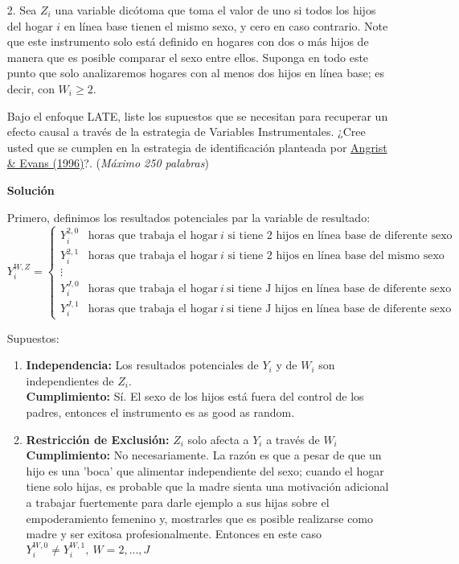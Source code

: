 \documentclass[a4paper, answers, addpoints, 11pt]{exam}
\newenvironment{solucion}{%
  \begin{mdframed}[
    backgroundcolor=blue!5,    %
    linecolor=blue!50,          %
    linewidth=2pt,              %
    leftmargin=10pt,            %
    rightmargin=8pt,           %
    topline=true,              %
    bottomline=true,            %
    roundcorner=10pt,           %
    innerleftmargin=10pt,       %
    innerrightmargin=10pt,      %
    innerbottommargin=10pt,     %
    innertopmargin=10pt         %
  ]%
  \begin{tcolorbox}[colframe=blue!50!black, colback=blue!50, coltitle=white, sharp corners=all, boxrule=1mm, width=\textwidth, halign=left, valign=center, top=0mm, bottom=0mm, left=0mm, right=0mm] \textbf{Solución} \end{tcolorbox} }{\end{mdframed}}
\begin{document}
\begin{enumerate}
    \item[2.] Sea \(Z_i\) una variable dicótoma que toma el valor de uno si todos los hijos del hogar \(i\) en línea base tienen el mismo sexo, y cero en caso contrario. Note que este instrumento solo está definido en hogares con dos o más hijos de manera que es posible comparar el sexo entre ellos. Suponga en todo este punto que solo analizaremos hogares con al menos dos hijos en línea base; es decir, con $W_i \geq 2$.

    \bigbreak
    Bajo el enfoque LATE, liste los supuestos que se necesitan para recuperar un efecto causal a través de la estrategia de Variables Instrumentales. ¿Cree usted que se cumplen en la estrategia de identificación planteada por \href{https://www.nber.org/system/files/working_papers/w5778/w5778.pdf}{Angrist \& Evans (1996)}?. (\textit{Máximo 250 palabras})  

\begin{solucion}
Primero, definimos los resultados potenciales par la variable de resultado: 
\begin{equation*}
    Y_i^{W,Z} = \begin{cases}  Y_i^{2,0} & \text{horas que trabaja el hogar} \: i  \text{ si tiene 2 hijos en línea base  de diferente sexo}  \\Y_i^{2,1} & \text{horas que trabaja el hogar} \:i \text{ si tiene 2 hijos en línea base  del mismo sexo} \\
    \vdots\\
     Y_i^{J,0} & \text{horas que trabaja el hogar} \:i \:\text{si tiene J hijos en línea base  de diferente sexo} \\ Y_i^{J,1} & \text{horas que trabaja el hogar}\: i \: \text{si tiene J hijos en línea base  de diferente sexo}
     \end{cases}
\end{equation*}

Supuestos:
\begin{enumerate}
    \item \textbf{Independencia:}  Los resultados potenciales de $Y_i$ y de $W_i$ son independientes de $Z_i$. \\
    \textbf{Cumplimiento:} Sí. El sexo de los hijos está fuera del control de los padres, entonces el instrumento es as good as random.
    
    
    \item \textbf{Restricci\'on de Exclusi\'on:}  $Z_i$ solo afecta a $Y_i$ a trav\'es de $W_i$
     \\
    \textbf{Cumplimiento:} No necesariamente. La razón es que a pesar de que un hijo es una 'boca' que alimentar independiente del sexo; cuando el hogar tiene solo hijas, es probable que la madre sienta una motivación adicional a trabajar fuertemente para darle ejemplo a sus hijas sobre el empoderamiento femenino y, mostrarles que es posible realizarse como madre y ser exitosa profesionalmente. Entonces en este caso $Y_i^{W,0} \neq Y_i^{W,1},\: W=2,..., J$
    

\end{enumerate}
\end{solucion}
\end{enumerate}
\end{document}
